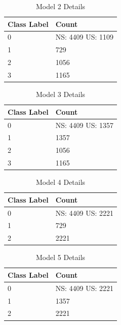 \documentclass[12pt]{article}
\begin{document}
\begin{table}[tbp]
\centering
\begin{tabularx}{\linewidth}{ l X}
\toprule
   Class Label & Count \\
\midrule
0 & NS: 4409 \newline US: 1109 \\
1 & 729\\
2 & 1056\\
3 & 1165\\

\bottomrule
\end{tabularx}
\caption{Model 2 Details}
\label{tbl:model2_details}
\end{table}

\begin{table}[tbp]
\centering
\begin{tabularx}{\linewidth}{ l X}
\toprule
   Class Label & Count \\
\midrule
0 & NS: 4409 \newline US: 1357\\
1 & 1357\\
2 & 1056\\
3 & 1165\\
\bottomrule
\end{tabularx}
\caption{Model 3 Details}
\label{tbl:model3_details}
\end{table}

\begin{table}[tbp]
\centering
\begin{tabularx}{\linewidth}{ l X}
\toprule
   Class Label & Count \\
\midrule
0 & NS: 4409 \newline US: 2221\\
1 & 729\\
2 & 2221\\

\bottomrule
\end{tabularx}
\caption{Model 4 Details}
\label{tbl:model4_details}
\end{table}

\begin{table}[tbp]
\centering
\begin{tabularx}{\linewidth}{ l X}
\toprule
   Class Label & Count \\
\midrule
0 & NS: 4409 \newline US: 2221\\
1 & 1357\\
2 & 2221\\

\bottomrule
\end{tabularx}
\caption{Model 5 Details}
\label{tbl:model5_details}
\end{table}
\end{document}
